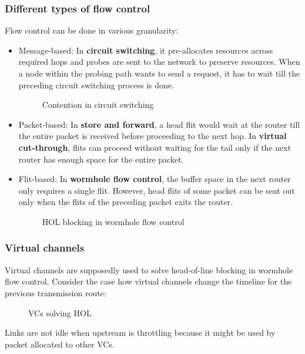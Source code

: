 \documentclass{article}
\begin{document}
\begin{multicols*}{2}
\subsubsection{Different types of flow control}
Flow control can be done in various granularity:
\begin{itemize}
    \item Message-based: In \textbf{circuit switching}, it pre-allocates resources across required hops and probes are sent to the network to preserve resources. When a node within the probing path wants to send a request, it has to wait till the preceding circuit switching process is done.
    \begin{figure}[H]
        \caption{Contention in circuit switching}
    \end{figure}    
    \item Packet-based: In \textbf{store and forward}, a head flit would wait at the router till the entire packet is received before proceeding to the next hop. In \textbf{virtual cut-through}, flits can proceed without waiting for the tail only if the next router has enough space for the entire packet.
    \item Flit-based: In \textbf{wormhole flow control}, the buffer space in the next router only requires a single flit. However, head flits of some packet can be sent out only when the flits of the preceding packet exits the router.
    \begin{figure}[H]
        \caption{HOL blocking in wormhole flow control}
    \end{figure}      
\end{itemize}

\subsubsection{Virtual channels}
Virtual channels are supposedly used to solve head-of-line blocking in wormhole flow control. Consider the case how virtual channels change the timeline for the previous transmission route:
\begin{figure}[H]
    \caption{VCs solving HOL}
\end{figure}
\noindent\newline
Links are not idle when upstream is throttling because it might be used by packet allocated to other VCs.

\end{multicols*}
\end{document}
